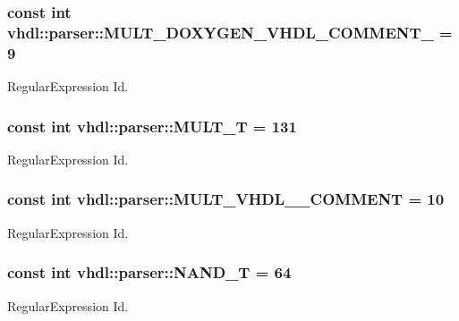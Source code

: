 \subsubsection[{M\+U\+L\+T\+\_\+\+D\+O\+X\+Y\+G\+E\+N\+\_\+\+V\+H\+D\+L\+\_\+\+C\+O\+M\+M\+E\+N\+T\+\_\+2008}]{\setlength{\rightskip}{0pt plus 5cm}const int vhdl\+::parser\+::\+M\+U\+L\+T\+\_\+\+D\+O\+X\+Y\+G\+E\+N\+\_\+\+V\+H\+D\+L\+\_\+\+C\+O\+M\+M\+E\+N\+T\+\_ = 9}\label{namespacevhdl_1_1parser_adb60e22d46d3fb0431f064c73e191650}
Regular\+Expression Id. \hypertarget{namespacevhdl_1_1parser_a01f6f37ddfe701bb2ea7fa3907e34e9e}{}
\subsubsection[{M\+U\+L\+T\+\_\+\+T}]{\setlength{\rightskip}{0pt plus 5cm}const int vhdl\+::parser\+::\+M\+U\+L\+T\+\_\+\+T = 131}\label{namespacevhdl_1_1parser_a01f6f37ddfe701bb2ea7fa3907e34e9e}
Regular\+Expression Id. \hypertarget{namespacevhdl_1_1parser_ac278a386337146ae3e20e2ec611897aa}{}
\subsubsection[{M\+U\+L\+T\+\_\+\+V\+H\+D\+L\+\_\+2008\+\_\+\+C\+O\+M\+M\+E\+N\+T}]{\setlength{\rightskip}{0pt plus 5cm}const int vhdl\+::parser\+::\+M\+U\+L\+T\+\_\+\+V\+H\+D\+L\+\_\+\_\+\+C\+O\+M\+M\+E\+N\+T = 10}\label{namespacevhdl_1_1parser_ac278a386337146ae3e20e2ec611897aa}
Regular\+Expression Id. \hypertarget{namespacevhdl_1_1parser_a4d64f78350ddc7e8f892b416b0fe5dbc}{}
\subsubsection[{N\+A\+N\+D\+\_\+\+T}]{\setlength{\rightskip}{0pt plus 5cm}const int vhdl\+::parser\+::\+N\+A\+N\+D\+\_\+\+T = 64}\label{namespacevhdl_1_1parser_a4d64f78350ddc7e8f892b416b0fe5dbc}
Regular\+Expression Id. \hypertarget{namespacevhdl_1_1parser_a38e064a2c0f63d96a97a67e25f18092e}{}
